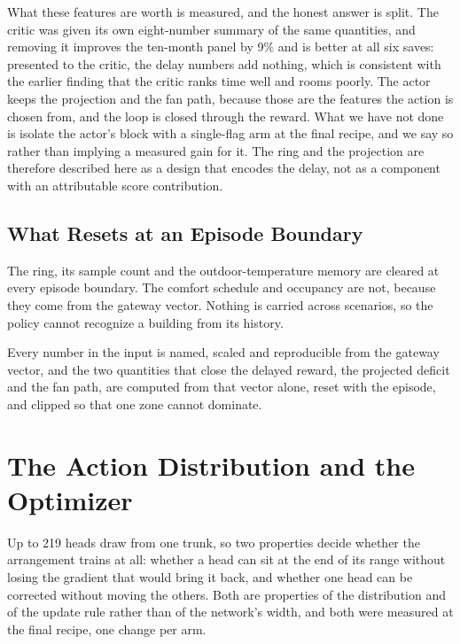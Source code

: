 \documentclass{article}
\begin{document}
What these features are worth is measured, and the honest answer is split. The critic was given its own eight-number summary of the same quantities, and removing it improves the ten-month panel by 9\% and is better at all six saves: presented to the critic, the delay numbers add nothing, which is consistent with the earlier finding that the critic ranks time well and rooms poorly. The actor keeps the projection and the fan path, because those are the features the action is chosen from, and the loop is closed through the reward. What we have not done is isolate the actor's block with a single-flag arm at the final recipe, and we say so rather than implying a measured gain for it. The ring and the projection are therefore described here as a design that encodes the delay, not as a component with an attributable score contribution.

\subsection{What Resets at an Episode Boundary}
\label{app:reset}

The ring, its sample count and the outdoor-temperature memory are cleared at every episode boundary. The comfort schedule and occupancy are not, because they come from the gateway vector. Nothing is carried across scenarios, so the policy cannot recognize a building from its history.

Every number in the input is named, scaled and reproducible from the gateway vector, and the two quantities that close the delayed reward, the projected deficit and the fan path, are computed from that vector alone, reset with the episode, and clipped so that one zone cannot dominate.

\section{The Action Distribution and the Optimizer}
\label{app:action}

Up to 219 heads draw from one trunk, so two properties decide whether the arrangement trains at all: whether a head can sit at the end of its range without losing the gradient that would bring it back, and whether one head can be corrected without moving the others. Both are properties of the distribution and of the update rule rather than of the network's width, and both were measured at the final recipe, one change per arm.
\end{document}
